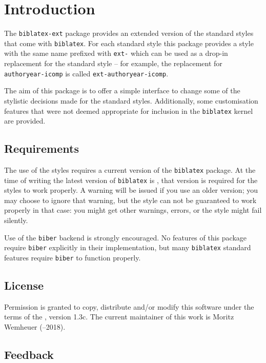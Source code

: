 \documentclass{ltxdockit}
\makeatletter
\newcommand*{\biblatexversion}{\extblx@requiredbiblatexversion}
\def\sty{\texttt}
\newcommand*{\biber}{\sty{biber}}
\makeatother
\begin{document}
\printtitlepage
\tableofcontents


\section{Introduction}\label{sec:int}
The \sty{biblatex-ext} package provides an extended version of the standard
styles that come with \sty{biblatex}.
For each standard style this package provides a style with the same name
prefixed with \texttt{ext-} which can be used as a drop-in replacement for the
standard style -- for example, the replacement for \texttt{authoryear-icomp}
is called \texttt{ext-authoryear-icomp}.

The aim of this package is to offer a simple interface to change some of the
stylistic decisions made for the standard styles.
Additionally, some customisation features that were not deemed appropriate
for inclusion in the \sty{biblatex} kernel are provided.

\subsection{Requirements}
The use of the styles requires a current version of the \sty{biblatex} package.
At the time of writing the latest version of \sty{biblatex} is \biblatexversion,
that version is required for the styles to work properly.
A warning will be issued if you use an older version; you may choose to ignore
that warning, but the style can not be guaranteed to work properly in that case:
you might get other warnings, errors, or the style might fail silently.

Use of the \biber{} backend is strongly encouraged.
No features of this package require \biber{} explicitly in their implementation,
but many \sty{biblatex} standard features require \biber{} to function properly.

\subsection{License}
Permission is granted to copy, distribute and\slash or modify this software
under the terms of the \lppl, version 1.3c.%
The current maintainer of this work is Moritz Wemheuer (--2018).


\subsection{Feedback}\label{subsec:int:feb}
\end{document}
